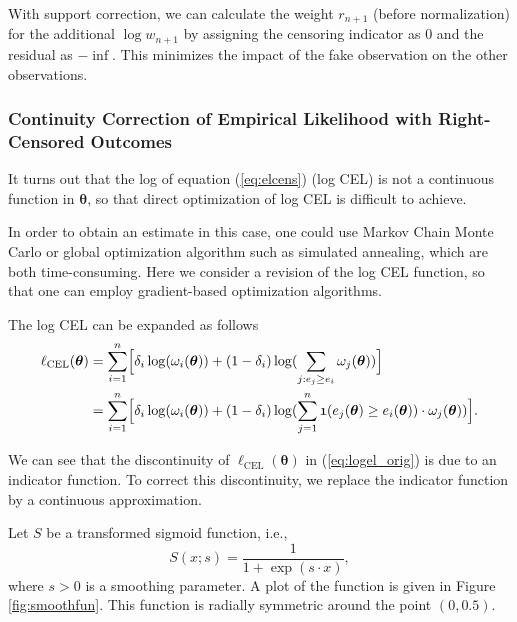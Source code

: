 \documentclass[article]{jss}
\newcommand{\tth}{\bm \theta}
\newcommand{\w}{\omega}
\newcommand{\CEL}{\textrm{CEL}}
\renewcommand{\|}{\,|\,}
\begin{document}
With support correction, we can calculate the weight \(r_{n+1}\) (before normalization) for the additional \(\log w_{n+1}\) by assigning the censoring indicator as \(0\) and the residual as \(-\inf\). This minimizes the impact of the fake observation on the other observations.

\hypertarget{continuity-correction-of-empirical-likelihood-with-right-censored-outcomes}{%
\subsubsection{Continuity Correction of Empirical Likelihood with Right-Censored Outcomes}\label{continuity-correction-of-empirical-likelihood-with-right-censored-outcomes}}

It turns out that the log of equation (\ref{eq:elcens}) (log CEL) is not a continuous function in \(\tth\), so that direct optimization of log CEL is difficult to achieve.

In order to obtain an estimate in this case, one could use Markov Chain Monte Carlo or global optimization algorithm such as simulated annealing, which are both time-consuming. Here we consider a revision of the log CEL function, so that one can employ gradient-based optimization algorithms.

The log CEL can be expanded as follows
\begin{equation}
\begin{split}
\ell_{\CEL}(\tth) &= \sum_{i=1}^n \Bigl[\delta_i\log(\w_i(\tth)) +
  (1-\delta_i)\log(\sum_{j:e_j \geq e_i} \w_j(\tth))\Bigr] \\
  &= \sum_{i=1}^n \Bigl[\delta_i\log(\w_i(\tth)) +
    (1-\delta_i)\log(\sum_{j=1}^n \mathfrak 1(e_j(\tth) \geq e_i(\tth)) \cdot \w_j(\tth))\Bigr].
\end{split}
\label{eq:logel_orig}
\end{equation}

We can see that the discontinuity of \(\ell_{\CEL}(\tth)\) in (\ref{eq:logel_orig}) is due to an indicator function. To correct this discontinuity, we replace the indicator function by a continuous approximation.

Let \(S\) be a transformed sigmoid function, i.e.,
\begin{equation}\label{eq:sigmoid}
  S(x; s) = \frac{1}{1+\exp(s\cdot x)},
\end{equation}
where \(s > 0\) is a smoothing parameter. A plot of the function is given in Figure \ref{fig:smoothfun}. This function is radially symmetric around the point \((0,0.5)\).
\end{document}
